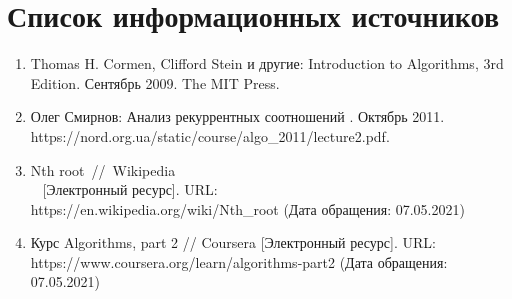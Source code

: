 \documentclass[a4paper, 14pt]{extarticle}
\begin{document}
\section*{Список информационных источников}
\begin{enumerate}[leftmargin=*]
  \item Thomas H. Cormen, Clifford Stein и другие: Introduction to Algorithms, 3rd Edition.
    Сентябрь 2009. The MIT Press.
  \item Олег Смирнов: Анализ рекуррентных соотношений . Октябрь 2011.
    \\ https://nord.org.ua/static/course/algo\_2011/lecture2.pdf.
  \item Nth root~//~Wikipedia \\~
    [Электронный ресурс]. URL:
    \\ https://en.wikipedia.org/wiki/Nth\_root
    (Дата обращения: 07.05.2021)
   \item Курс Algorithms, part 2 // Coursera [Электронный ресурс]. URL:
     \\ https://www.coursera.org/learn/algorithms-part2
     (Дата обращения: 07.05.2021)
\end{enumerate}
\end{document}
